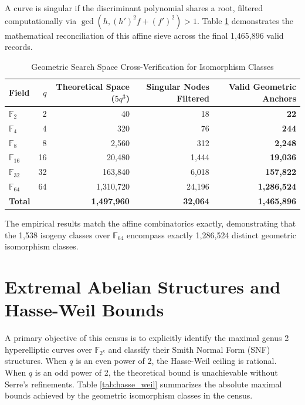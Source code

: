 \documentclass[letterpaper, 11pt]{article}
\begin{document}
	A curve is singular if the discriminant polynomial shares a root, filtered computationally via $\gcd(h, (h')^2f + (f')^2) > 1$. Table \ref{tab:geometric_space} demonstrates the mathematical reconciliation of this affine sieve across the final 1,465,896 valid records.
	
	\begin{table}[h]
		\centering
		\caption{Geometric Search Space Cross-Verification for Isomorphism Classes}
		\label{tab:geometric_space}
		\begin{tabular}{lrrrr}
			\toprule
			Field & $q$ & Theoretical Space ($5q^3$) & Singular Nodes Filtered & Valid Geometric Anchors \\
			\midrule
			$\mathbb{F}_2$ & 2 & 40 & 18 & \textbf{22} \\
			$\mathbb{F}_4$ & 4 & 320 & 76 & \textbf{244} \\
			$\mathbb{F}_8$ & 8 & 2,560 & 312 & \textbf{2,248} \\
			$\mathbb{F}_{16}$ & 16 & 20,480 & 1,444 & \textbf{19,036} \\
			$\mathbb{F}_{32}$ & 32 & 163,840 & 6,018 & \textbf{157,822} \\
			$\mathbb{F}_{64}$ & 64 & 1,310,720 & 24,196 & \textbf{1,286,524} \\
			\midrule
			\textbf{Total} & & \textbf{1,497,960} & \textbf{32,064} & \textbf{1,465,896} \\
			\bottomrule
		\end{tabular}
	\end{table}
	
	The empirical results match the affine combinatorics exactly, demonstrating that the 1,538 isogeny classes over $\mathbb{F}_{64}$ encompass exactly 1,286,524 distinct geometric isomorphism classes. 
	
	\section{Extremal Abelian Structures and Hasse-Weil Bounds}
	A primary objective of this census is to explicitly identify the maximal genus 2 hyperelliptic curves over $\mathbb{F}_{2^k}$ and classify their Smith Normal Form (SNF) structures. When $q$ is an even power of 2, the Hasse-Weil ceiling is rational. When $q$ is an odd power of 2, the theoretical bound is unachievable without Serre's refinements. Table \ref{tab:hasse_weil} summarizes the absolute maximal bounds achieved by the geometric isomorphism classes in the census.
	
\end{document}
